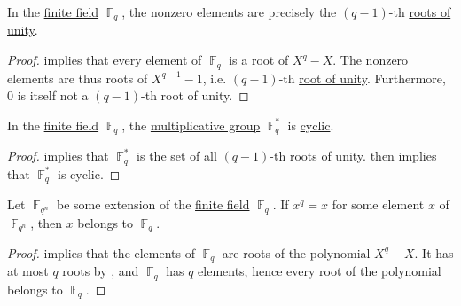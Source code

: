 \begin{lemma}\label{thm:finite_domain_roots_of_unity}
  In the \hyperref[def:finite_field]{finite field} \( \BbbF_q \), the nonzero elements are precisely the \( (q - 1) \)-th \hyperref[def:root_of_unity]{roots of unity}.
\end{lemma}
\begin{proof}
   implies that every element of \( \BbbF_q \) is a root of \( X^q - X \). The nonzero elements are thus roots of \( X^{q - 1} - 1 \), i.e. \( (q - 1) \)-th \hyperref[def:root_of_unity]{root of unity}. Furthermore, \( 0 \) is itself not a \( (q - 1) \)-th root of unity.
\end{proof}

\begin{proposition}\label{thm:finite_field_multiplicative_group_is_cyclic}
  In the \hyperref[def:finite_field]{finite field} \( \BbbF_q \), the \hyperref[def:semiring]{multiplicative group} \( \BbbF_q^* \) is
  \hyperref[def:cyclic_group]{cyclic}.
\end{proposition}
\begin{proof}
   implies that \( \BbbF_q^* \) is the set of all \( (q - 1) \)-th roots of unity.  then implies that \( \BbbF_q^* \) is cyclic.
\end{proof}

\begin{lemma}\label{thm:finite_field_roots_of_splitting_polynomial}
  Let \( \BbbF_{q^n} \) be some extension of the \hyperref[def:finite_field]{finite field} \( \BbbF_q \). If \( x^q = x \) for some element \( x \) of \( \BbbF_{q^n} \), then \( x \) belongs to \( \BbbF_q \).
\end{lemma}
\begin{proof}
   implies that the elements of \( \BbbF_q \) are roots of the polynomial \( X^q - X \). It has at most \( q \) roots by , and \( \BbbF_q \) has \( q \) elements, hence every root of the polynomial belongs to \( \BbbF_q \).
\end{proof}

